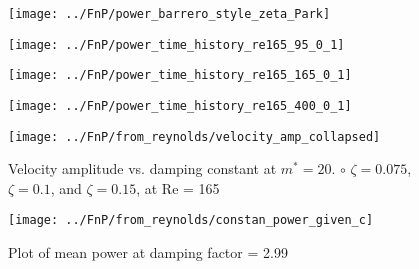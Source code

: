 \begin{figure}
\centering
\texttt{[image: ../FnP/power\_barrero\_style\_zeta\_Park]}
\caption{}
\label{fig:power_barrero_style_zeta_Park}
\end{figure}


 



\begin{figure}
\centering
\texttt{[image: ../FnP/power\_time\_history\_re165\_95\_0\_1]}
\caption{}
\label{fig:power_time_history_re165_95_0_1}
\end{figure}



\begin{figure}
\centering
\texttt{[image: ../FnP/power\_time\_history\_re165\_165\_0\_1]}
\caption{}
\label{fig:power_time_history_re165_85_0}
\end{figure}




\begin{figure}
\centering
\texttt{[image: ../FnP/power\_time\_history\_re165\_400\_0\_1]}
\caption{}
\label{fig:power_time_history_re165_400_0_1}
\end{figure}


\begin{figure}[htbp]
\centering
\texttt{[image: ../FnP/from\_reynolds/velocity\_amp\_collapsed]}
\caption{Velocity amplitude vs. damping constant at $m^*=20$. $\circ$ $\zeta = 0.075$,  $ \zeta = 0.1$,  and $\zeta = 0.15$, at Re = 165}
\label{velocity_amplitude_damping_constant_diff_zeta}
\end{figure}



\begin{figure}[htbp]
\centering
\texttt{[image: ../FnP/from\_reynolds/constan\_power\_given\_c]}
\caption{Plot of mean power at  damping factor = 2.99}
\label{fig:constan_power_given_c}
\end{figure}


















